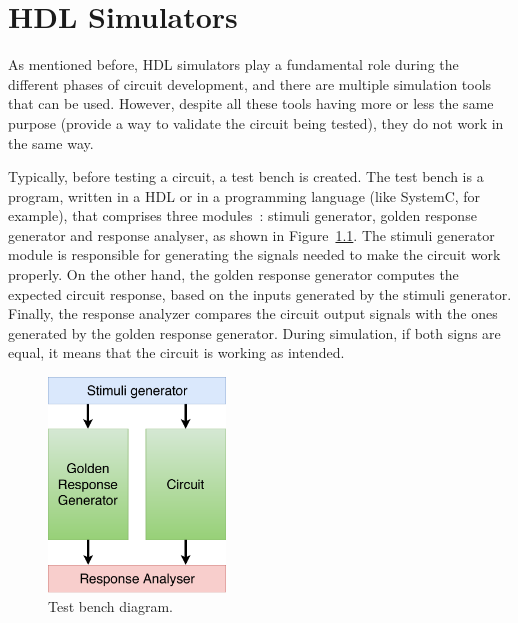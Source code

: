 
\chapter{HDL Simulators}
\label{chapter:simulators}

As mentioned before, HDL simulators play a fundamental role during the different
phases of circuit development, and there are multiple simulation tools that can
be used. However, despite all these tools having more or less the same purpose
(provide a way to validate the circuit being tested), they do not work in the
same way.

Typically, before testing a circuit, a test bench is created. The test bench is
a program, written in a HDL or in a programming language (like SystemC, for
example), that comprises three modules~\cite{tan:vhstas}: stimuli generator,
golden response generator and response analyser, as shown in
Figure~\ref{fig:tb}. The stimuli generator module is responsible for generating
the signals needed to make the circuit work properly. On the other hand, the
golden response generator computes the expected circuit response, based on the
inputs generated by the stimuli generator. Finally, the response analyzer
compares the circuit output signals with the ones generated by the golden
response generator. During simulation, if both signs are equal, it means that
the circuit is working as intended.

\begin{figure}[!htb]
	\centering
	\includegraphics[width=0.42\textwidth]{Figures/Testbench.pdf}
	\caption{Test bench diagram.}
	\label{fig:tb}
\end{figure}

